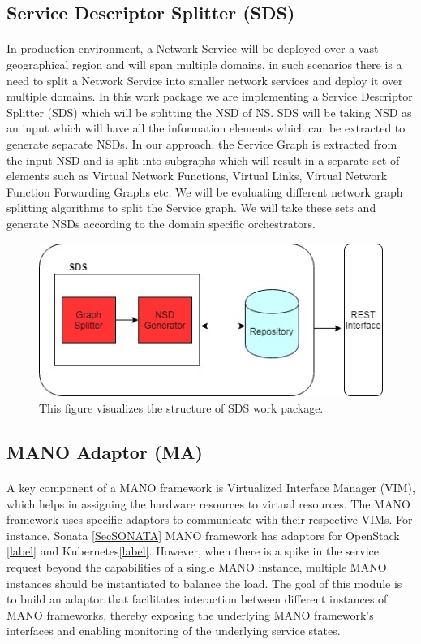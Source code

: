 \subsection{Service Descriptor Splitter (SDS)}
\paragraph{}

In production environment, a Network Service will be deployed over a vast geographical region and will span multiple domains, in such scenarios there is a need to split a Network Service into smaller network services and deploy it over multiple domains. In this work package we are implementing a Service Descriptor Splitter (SDS) which will be splitting the NSD of NS. SDS will be taking NSD as an input which will have all the information elements which can be extracted to generate separate NSDs. In our approach, the Service Graph is extracted from the input NSD and is split into subgraphs which will result in a separate set of elements such as Virtual Network Functions, Virtual Links, Virtual Network Function Forwarding Graphs etc. We will be evaluating different network graph splitting algorithms to split the Service graph. We will take these sets and generate NSDs according to the domain specific orchestrators.

\begin{figure}[h]
	\centering
	\includegraphics[width=0.7\linewidth]{figures/splitter_diagram}
	\caption{This figure visualizes the structure of SDS work package. }
	\label{fig:splitterDiagram}
\end{figure}

\subsection{MANO Adaptor (MA)}
\paragraph{}

A key component of a MANO framework is Virtualized Interface Manager (VIM),  which helps in assigning the hardware resources to virtual resources. The MANO framework uses specific adaptors to communicate with their respective VIMs. For instance, Sonata \ref{SecSONATA} MANO framework has adaptors for OpenStack \ref{label} and Kubernetes\ref{label}. However, when there is a spike in the service request beyond the capabilities of a single MANO instance, multiple MANO instances should be instantiated to balance the load. The goal of this module is to build an adaptor that facilitates interaction between different instances of MANO frameworks, thereby exposing the underlying MANO framework's interfaces and enabling monitoring of the underlying service states.

